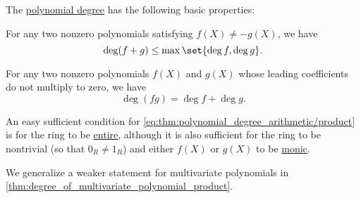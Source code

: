 \begin{proposition}\label{thm:polynomial_degree_arithmetic}
  The \hyperref[def:polynomial_degree]{polynomial degree} has the following basic properties:
  \begin{thmenum}
     For any two nonzero polynomials satisfying \( f(X) \neq -g(X) \), we have
    \begin{equation}\label{eq:thm:polynomial_degree_arithmetic/sum}
      \deg (f + g) \leq \max \set{ \deg f, \deg g }.
    \end{equation}

     For any two nonzero polynomials \( f(X) \) and \( g(X) \) whose leading coefficients do not multiply to zero, we have
    \begin{equation}\label{eq:thm:polynomial_degree_arithmetic/product}
      \deg (fg) = \deg f + \deg g.
    \end{equation}
  \end{thmenum}
\end{proposition}
\begin{comments}
  \item An easy sufficient condition for \eqref{eq:thm:polynomial_degree_arithmetic/product} is for the ring to be \hyperref[def:entire_semiring]{entire}, although it is also sufficient for the ring to be nontrivial (so that \( 0_R \neq 1_R \)) and either \( f(X) \) or \( g(X) \) to be \hyperref[def:monic_polynomial]{monic}.

  \item We generalize a weaker statement for multivariate polynomials in \cref{thm:degree_of_multivariate_polynomial_product}.
\end{comments}
